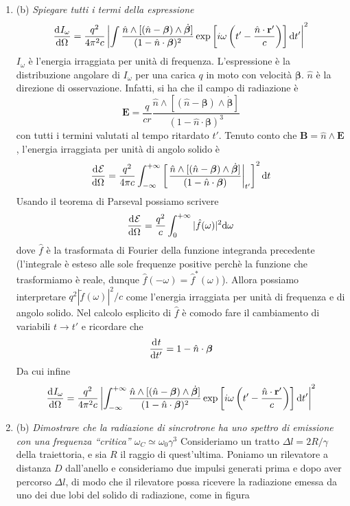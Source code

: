 \documentclass{article}
\renewcommand{\b}{(b)}
\renewcommand{\t}[1]{\textit{ #1}}
\renewcommand{\vec}[1]{\mathbf{#1}}
\begin{document}
\begin{enumerate}
	\item\b\t{Spiegare tutti i termi della espressione
		\[\der{I_\omega}{\Omega}=\frac{q^2}{4\pi^2c}\left|\int\frac{\hat{n}\wedge[(\hat{n}-\bm{\beta})\wedge\dot{\bm{\beta}}]}{(1-\hat{n}\cdot\bm{\beta})^2}\exp\left[i\omega\left(t'-\frac{\hat{n}\cdot\vec{r}'}{c}\right)\right]\d t'\right|^2\]}
	$I_\omega$ è l'energia irraggiata per unità di frequenza. L'espressione è la distribuzione angolare di $I_\omega$ per una carica $q$ in moto con velocità $\bm{\beta}$. $\hat{n}$ è la direzione di osservazione. Infatti, si ha che il campo di radiazione è
	\[\vec{E}=\frac{q}{cr}\frac{\hat{n}\wedge[(\hat{n}-\bm{\beta})\wedge\dot{\bm{\beta}}]}{(1-\hat{n}\cdot\bm{\beta})^3}\]
	con tutti i termini valutati al tempo ritardato $t'$. Tenuto conto che $\vec{B}=\hat{n}\wedge\vec{E}$, l'energia irraggiata per unità di angolo solido è
	\[\der{\mathcal{E}}{\Omega}=\frac{q^2}{4\pi c}\int_{-\infty}^{+\infty}\left[\left.\frac{\hat{n}\wedge[(\hat{n}-\bm{\beta})\wedge\dot{\bm{\beta}}]}{(1-\hat{n}\cdot\bm{\beta})}\right|_{t'}\right]^2\d t\]
	Usando il teorema di Parseval possiamo scrivere
	\[\der{\mathcal{E}}{\Omega}=\frac{q^2}{c}\int_{0}^{+\infty}|\hat{f}(\omega)|^2\d \omega\]
	dove $\hat{f}$ è la trasformata di Fourier della funzione integranda precedente (l'integrale è esteso alle sole frequenze positive perchè la funzione che trasformiamo è reale, dunque $\hat{f}(-\omega)=\hat{f}^*(\omega)$). Allora possiamo interpretare $q^2|\tilde{f}(\omega)|^2/c$ come l'energia irraggiata per unità di frequenza e di angolo solido. Nel calcolo esplicito di $\hat{f}$ è comodo fare il cambiamento di variabili $t\to t'$ e ricordare che
	\[\der{t}{t'}=1-\hat{n}\cdot\bm{\beta}\]
	Da cui infine
	\[\der{I_\omega}{\Omega}=\frac{q^2}{4\pi^2 c}\left|\int_{-\infty}^{+\infty}\frac{\hat{n}\wedge[(\hat{n}-\bm{\beta})\wedge\dot{\bm{\beta}}]}{(1-\hat{n}\cdot\bm{\beta})^2}\exp\left[i\omega\left(t'-\frac{\hat{n}\cdot\vec{r}'}{c}\right)\right]\d t'\right|^2\]
	\item\b\t{Dimostrare che la radiazione di sincrotrone ha uno spettro di emissione con una
		frequenza “critica” $\omega_C\simeq\omega_0\gamma^3$} 
	Consideriamo un tratto $\Delta l=2R/\gamma$ della traiettoria, e sia $R$ il raggio di quest'ultima. Poniamo un rilevatore a distanza $D$ dall'anello e consideriamo due impulsi generati prima e dopo aver percorso $\Delta l$, di modo che il rilevatore possa ricevere la radiazione emessa da uno dei due lobi del solido di radiazione, come in figura
	\begin{center}
		\begin{tikzpicture}

\end{tikzpicture}
\end{center}
\end{enumerate}
\end{document}
